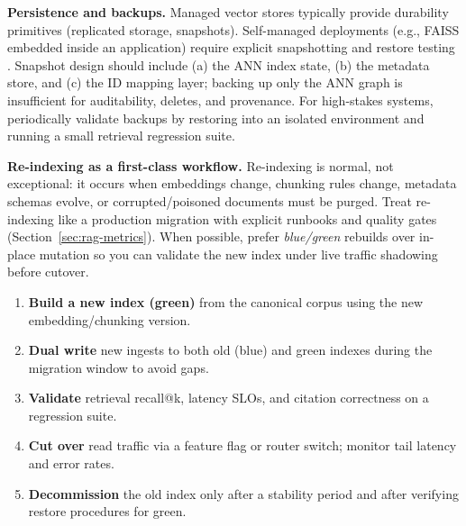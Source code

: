 \textbf{Persistence and backups.} Managed vector stores typically provide durability primitives (replicated storage, snapshots). Self-managed deployments (e.g., FAISS embedded inside an application) require explicit snapshotting and restore testing \cite{Johnson2019FAISS}. Snapshot design should include (a) the ANN index state, (b) the metadata store, and (c) the ID mapping layer; backing up only the ANN graph is insufficient for auditability, deletes, and provenance. For high-stakes systems, periodically validate backups by restoring into an isolated environment and running a small retrieval regression suite.

\textbf{Re-indexing as a first-class workflow.} Re-indexing is normal, not exceptional: it occurs when embeddings change, chunking rules change, metadata schemas evolve, or corrupted/poisoned documents must be purged. Treat re-indexing like a production migration with explicit runbooks and quality gates (Section~\ref{sec:rag-metrics}). When possible, prefer \emph{blue/green} rebuilds over in-place mutation so you can validate the new index under live traffic shadowing before cutover.

\begin{tcolorbox}[
  title={\textbf{Engineering sidebar: Blue/green re-indexing pattern}},
  colback=blue!5,
  colframe=blue!40!black,
  colbacktitle=blue!20,
  coltitle=black,
  fonttitle=\bfseries,
  boxrule=0.7pt,
  arc=4pt,
  left=5mm, right=5mm, top=4mm, bottom=4mm,
  before skip=6pt,
  after skip=6pt
]
\small
\begin{enumerate}[leftmargin=1.8em, itemsep=3pt]
  \item \textbf{Build a new index (green)} from the canonical corpus using the new embedding/chunking version.
  \item \textbf{Dual write} new ingests to both old (blue) and green indexes during the migration window to avoid gaps.
  \item \textbf{Validate} retrieval recall@k, latency SLOs, and citation correctness on a regression suite.
  \item \textbf{Cut over} read traffic via a feature flag or router switch; monitor tail latency and error rates.
  \item \textbf{Decommission} the old index only after a stability period and after verifying restore procedures for green.
\end{enumerate}
\end{tcolorbox}

